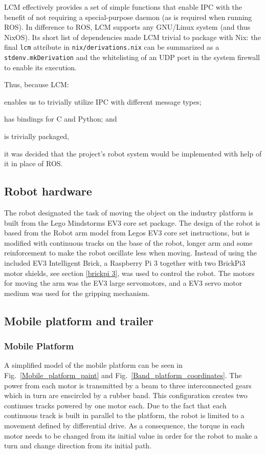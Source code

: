 LCM effectively provides a set of simple functions that enable IPC with the benefit of not requiring a special-purpose daemon (as is required when running ROS).
In difference to ROS, LCM supports any GNU/Linux system (and thus NixOS).
Its short list of dependencies made LCM trivial to package with Nix:
the final \texttt{lcm} attribute in \texttt{nix/derivations.nix} can be summarized as a \texttt{stdenv.mkDerivation} and the whitelisting of an UDP port in the system firewall to enable its execution.

Thus, because LCM:
\begin{inline-enum}
\item enables us to trivially utilize IPC with different message types;
\item has bindings for C and Python; and
\item is trivially packaged,
\end{inline-enum}
it was decided that the project's robot system would be implemented with help of it in place of ROS.

\subsection{Robot hardware}
\label{sec:simon1}
The robot designated the task of moving the object on the industry platform is built from the Lego Mindstorms EV3 core set package. The design of the robot is based from the Robot arm model from Legos EV3 core set instructions, but is modified with continuous tracks on the base of the robot, longer arm and some reinforcement to make the robot oscillate less when moving. Instead of using the included EV3 Intelligent Brick, a Raspberry Pi 3 together with two BrickPi3 motor shields, see section \ref{brickpi 3}, was used to control the robot. The motors for moving the arm was the EV3 large servomotors, and a EV3 servo motor medium was used for the gripping mechanism.



\subsection {Mobile platform and trailer}
\subsubsection{Mobile Platform}
A simplified model of the mobile platform can be seen in Fig.~\ref{Mobile_platform_paint} and Fig.~\ref{Band_platform_coordinates}. The power from each motor is transmitted by a beam to three interconnected gears which in turn are enscircled by a rubber band. This configuration  creates two continues tracks powered by one motor each. Due to the fact that each continuous track is built in parallel to the platform, the robot is limited to a movement defined by differential drive. As a consequence, the torque in each motor needs to be changed from its initial value in order for the robot to make a turn and change direction from its initial path.



